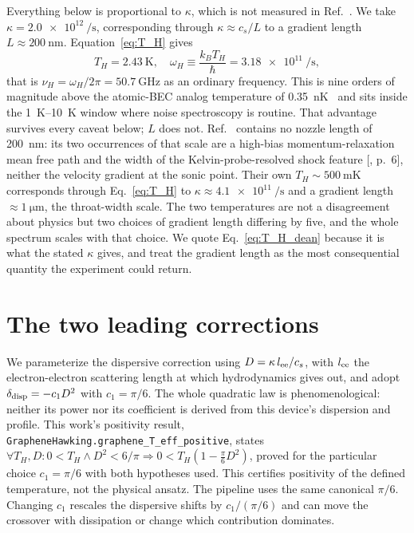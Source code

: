 \documentclass[aps,prl,twocolumn,superscriptaddress,nofootinbib]{revtex4-2}
\begin{document}
Everything below is proportional to $\kappa$, which is not measured in
Ref.~\cite{Geurs2025}. We take $\kappa = \SI{2.0e12}{\per\second}$,
corresponding through $\kappa \approx c_s/L$ to a gradient length
$L \approx \SI{200}{\nano\meter}$. Equation~\eqref{eq:T_H} gives
\begin{equation}
T_H = \SI{2.43}{\kelvin}, \quad
\omega_H \equiv \frac{k_B T_H}{\hbar} = \SI{3.18e11}{\per\second},
\label{eq:T_H_dean}
\end{equation}
that is $\nu_H = \omega_H/2\pi = \SI{50.7}{\giga\hertz}$ as an ordinary
frequency. This is nine orders of magnitude above the atomic-BEC analog
temperature of \SI{0.35}{\nano\kelvin}~\cite{Steinhauer2016,deNova2019} and
sits inside the \SIrange{1}{10}{\kelvin} window where noise spectroscopy is
routine. That advantage survives every caveat below; $L$ does not.
Ref.~\cite{Geurs2025} contains no nozzle length of
\SI{200}{\nano\meter}: its two occurrences of that scale are a high-bias
momentum-relaxation mean free path and the width of the
Kelvin-probe-resolved shock feature [, p.~6], neither
the velocity gradient at the sonic point. Their own
$T_H \sim \SI{500}{\milli\kelvin}$ corresponds through Eq.~\eqref{eq:T_H}
to $\kappa \approx \SI{4.1e11}{\per\second}$ and a gradient length
$\approx\SI{1}{\micro\meter}$, the throat-width scale. The two temperatures
are not a disagreement about physics but two choices of gradient length
differing by five, and the whole spectrum scales with that choice. We quote
Eq.~\eqref{eq:T_H_dean} because it is what the stated $\kappa$ gives, and
treat the gradient length as the most consequential quantity the experiment
could return.

\section{The two leading corrections}

We parameterize the dispersive correction using
$D = \kappa\,l_{\rm ee}/c_s$, with $l_{\rm ee}$ the electron-electron
scattering length at which hydrodynamics gives out, and adopt
$\delta_{\rm disp} = -c_1 D^2$ with $c_1 = \pi/6$.
The whole quadratic law is phenomenological: neither its power nor its
coefficient is derived from this device's dispersion and profile.
This work's positivity result,
\texttt{GrapheneHawking.graphene\_T\_eff\_positive}, states
$\forall T_H, D: 0 < T_H \wedge D^2 < 6/\pi \Rightarrow
0 < T_H(1 - \tfrac{\pi}{6}D^2)$, proved for the particular choice
$c_1 = \pi/6$ with both hypotheses used. This certifies positivity
of the defined temperature, not the physical ansatz. The pipeline uses
the same canonical $\pi/6$. Changing $c_1$ rescales
the dispersive shifts by $c_1/(\pi/6)$ and can move the crossover with
dissipation or change which contribution dominates.
\end{document}
